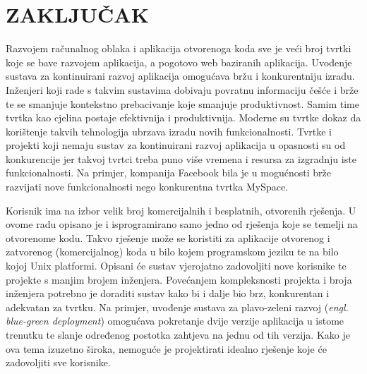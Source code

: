 \chapter{ZAKLJUČAK}
Razvojem računalnog oblaka i aplikacija otvorenoga koda sve je veći broj tvrtki koje se bave razvojem
aplikacija, a pogotovo web baziranih aplikacija. Uvođenje sustava za kontinuirani razvoj aplikacija
omogućava bržu i konkurentniju izradu. Inženjeri koji rade s takvim sustavima dobivaju povratnu
informaciju češće i brže te se smanjuje kontekstno prebacivanje koje smanjuje produktivnost. Samim
time tvrtka kao cjelina postaje efektivnija i produktivnija. Moderne su tvrtke dokaz da korištenje
takvih tehnologija ubrzava izradu novih funkcionalnosti. Tvrtke i projekti koji nemaju sustav za
kontinuirani razvoj aplikacija u opasnosti su od konkurencije jer takvoj tvrtci treba puno više
vremena i resursa za izgradnju iste funkcionalnosti. Na primjer, kompanija Facebook bila je u mogućnosti
brže razvijati nove funkcionalnosti nego konkurentna tvrtka MySpace.

Korisnik ima na izbor velik broj komercijalnih i besplatnih, otvorenih rješenja. U ovome radu
opisano je i isprogramirano samo jedno od rješenja koje se temelji na otvorenome kodu. Takvo
rješenje može se koristiti za aplikacije otvorenog i zatvorenog (komercijalnog) koda u bilo kojem
programskom jeziku te na bilo kojoj Unix platformi. Opisani će sustav vjerojatno zadovoljiti nove
korisnike te projekte s manjim brojem inženjera. Povećanjem kompleksnosti projekta i broja
inženjera potrebno je doraditi sustav kako bi i dalje bio brz, konkurentan i adekvatan za tvrtku. Na
primjer, uvođenje sustava za plavo-zeleni razvoj (\textit{engl. blue-green deployment}) omogućava
pokretanje dvije verzije aplikacija u istome trenutku te slanje određenog postotka zahtjeva na jednu
od tih verzija.  Kako je ova tema izuzetno široka, nemoguće je projektirati idealno rješenje koje
će zadovoljiti sve korisnike.


